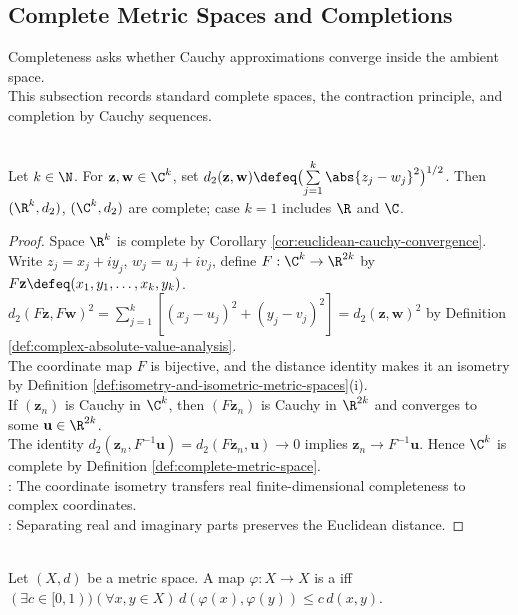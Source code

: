 \subsection{Complete Metric Spaces and Completions}\label{subsec:complete-metric-spaces-and-completions}

Completeness asks whether Cauchy approximations converge inside the ambient space.\\
This subsection records standard complete spaces, the contraction principle, and completion by Cauchy sequences.

\begin{example} \label{ex:finite-dimensional-complete-metric-spaces} \\
Let $k\in\N$. For $\mathbf{z},\mathbf{w}\in\C^k$, set $d_2(\mathbf{z},\mathbf{w})\defeq\bigl(\sum\limits_{j=1}^k\abs{z_j-w_j}^2\bigr)^{1/2}$. Then $(\R^k,d_2)$, $(\C^k,d_2)$ are complete; case $k=1$ includes $\R$ and $\C$.
\begin{proof}
Space $\R^k$ is complete by Corollary \ref{cor:euclidean-cauchy-convergence}. Write $z_j=x_j+iy_j$, $w_j=u_j+iv_j$, define $F:\C^k\to\R^{2k}$ by $F\mathbf{z}\defeq(x_1,y_1,\ldots,x_k,y_k)$.\\
$d_2(F\mathbf{z},F\mathbf{w})^2=\sum\limits_{j=1}^k[(x_j-u_j)^2+(y_j-v_j)^2]=d_2(\mathbf{z},\mathbf{w})^2$ by Definition \ref{def:complex-absolute-value-analysis}.\\
The coordinate map $F$ is bijective, and the distance identity makes it an isometry by Definition \ref{def:isometry-and-isometric-metric-spaces}(i).\\
If $(\mathbf{z}_n)$ is Cauchy in $\C^k$, then $(F\mathbf{z}_n)$ is Cauchy in $\R^{2k}$ and converges to some $\mathbf{u}\in\R^{2k}$.\\
The identity $d_2(\mathbf{z}_n,F^{-1}\mathbf{u})=d_2(F\mathbf{z}_n,\mathbf{u})\to0$ implies $\mathbf{z}_n\to F^{-1}\mathbf{u}$. Hence $\C^k$ is complete by Definition \ref{def:complete-metric-space}.\\
: The coordinate isometry transfers real finite-dimensional completeness to complex coordinates.\\
: Separating real and imaginary parts preserves the Euclidean distance.
\end{proof}
\end{example}

\begin{definition} \label{def:contraction-mapping} \\
Let $(X,d)$ be a metric space. A map $\varphi:X\to X$ is a  iff $(\exists c\in[0,1))(\forall x,y\in X)\,d(\varphi(x),\varphi(y))\leq c\,d(x,y)$.
\end{definition}


